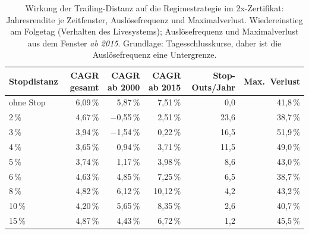 \begin{table}[htbp]
  \centering
  \caption[Kosten der Stopdistanz]{Wirkung der Trailing-Distanz auf die Regimestrategie im 2x-Zertifikat: Jahresrendite je Zeitfenster, Ausl\"osefrequenz und Maximalverlust. Wiedereinstieg am Folgetag (Verhalten des Livesystems); Ausl\"osefrequenz und Maximalverlust aus dem Fenster \emph{ab 2015}. Grundlage: Tagesschlusskurse, daher ist die Ausl\"osefrequenz eine Untergrenze.\quelleeigen}
  \label{tab:anhang-trailing-distanz}
  \begin{tabular}{@{}lrrrrr@{}}
    \toprule
    Stopdistanz & CAGR gesamt & CAGR ab 2000 & CAGR ab 2015 & Stop-Outs/Jahr & Max.\ Verlust \\
    \midrule
    ohne Stop & 6{,}09\,\% & 5{,}87\,\% & 7{,}51\,\% & 0{,}0 & 41{,}8\,\% \\
    2\,\% & 4{,}67\,\% & $-$0{,}55\,\% & 2{,}51\,\% & 23{,}6 & 38{,}7\,\% \\
    3\,\% & 3{,}94\,\% & $-$1{,}54\,\% & 0{,}22\,\% & 16{,}5 & 51{,}9\,\% \\
    4\,\% & 3{,}65\,\% & 0{,}94\,\% & 3{,}71\,\% & 11{,}5 & 49{,}0\,\% \\
    5\,\% & 3{,}74\,\% & 1{,}17\,\% & 3{,}98\,\% & 8{,}6 & 43{,}0\,\% \\
    6\,\% & 4{,}63\,\% & 4{,}85\,\% & 7{,}25\,\% & 6{,}5 & 38{,}7\,\% \\
    8\,\% & 4{,}82\,\% & 6{,}12\,\% & 10{,}12\,\% & 4{,}2 & 43{,}2\,\% \\
    10\,\% & 4{,}20\,\% & 5{,}65\,\% & 8{,}35\,\% & 2{,}6 & 40{,}7\,\% \\
    15\,\% & 4{,}87\,\% & 4{,}43\,\% & 6{,}72\,\% & 1{,}2 & 45{,}5\,\% \\
    \bottomrule
  \end{tabular}
\end{table}
